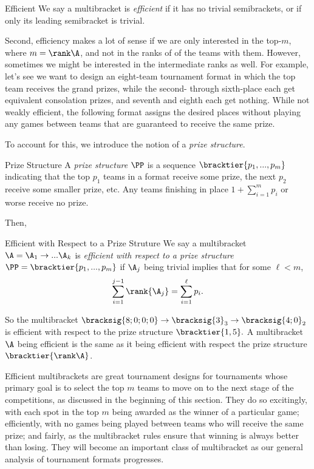{    \begin{definition}{Efficient}{}
        We say a multibracket is \textit{efficient} if it has no trivial semibrackets, or if only its leading semibracket is trivial.
    \end{definition}

    Second, efficiency makes a lot of sense if we are only interested in the top-$m$, where $m = \rank\A$, and not in the ranks of of the teams with them. However, sometimes we might be interested in the intermediate ranks as well. For example, let's see we want to design an eight-team tournament format in which the top team receives the grand prizes, while the second- through sixth-place each get equivalent consolation prizes, and seventh and eighth each get nothing. While not weakly efficient, the following format assigns the desired places without playing any games between teams that are guaranteed to receive the same prize.


    To account for this, we introduce the notion of a \textit{prize structure}.
    
    \begin{definition}{Prize Structure}{}
        A \textit{prize structure} $\PP$ is a sequence $\bracktier{p_1, ..., p_m}$ indicating that the top $p_1$ teams in a format receive some prize, the next $p_2$ receive some smaller prize, etc. Any teams finishing in place $1 + \sum_{i=1}^m p_i$ or worse receive no prize.
    \end{definition}

    Then,

    \begin{definition}{Efficient with Respect to a Prize Struture}{}
        We say a multibracket $\A = \A_1 \to ... \A_k$ is \textit{efficient with respect to a prize structure} $\PP = \bracktier{p_1, ..., p_m}$ if $\A_j$ being trivial implies that for some $\ell < m$, $$\sum_{i=1}^{j-1} \rank {\A_j} = \sum_{i=1}^\ell p_i.$$
    \end{definition}

    So the multibracket $\bracksig{8;0;0;0} \to \bracksig{3}_3 \to \bracksig{4;0}_2$ is efficient with respect to the prize structure $\bracktier{1, 5}.$ A multibracket $\A$ being efficient is the same as it being efficient with respect the prize structure $\bracktier{\rank\A}$.

    Efficient multibrackets are great tournament designs for tournaments whose primary goal is to select the top $m$ teams to move on to the next stage of the competitions, as discussed in the beginning of this section. They do so excitingly, with each spot in the top $m$ being awarded as the winner of a particular game; efficiently, with no games being played between teams who will receive the same prize; and fairly, as the multibracket rules ensure that winning is always better than losing. They will become an important class of multibracket as our general analysis of tournament formats progresses.
}